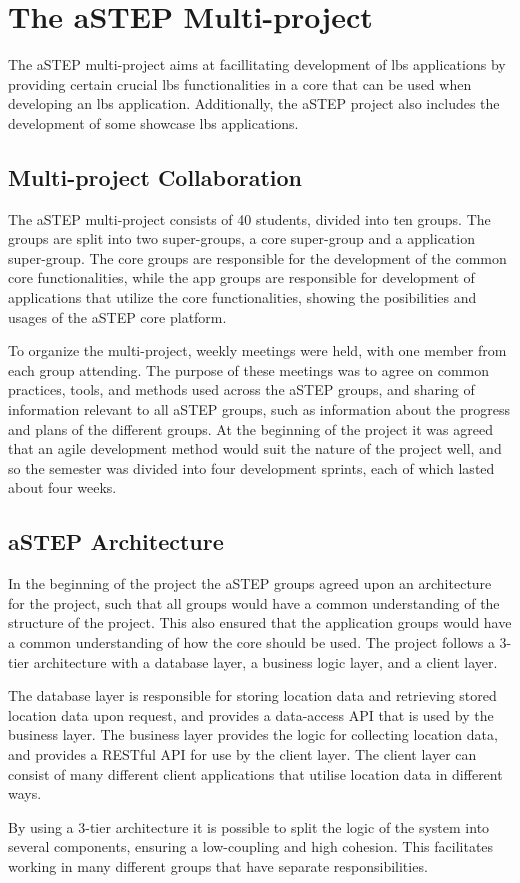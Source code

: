 \section{The aSTEP Multi-project} \label{sec:astep}
The aSTEP multi-project aims at facillitating development of \gls{lbs} applications by providing certain crucial \gls{lbs} functionalities in a core that can be used when developing an \gls{lbs} application. Additionally, the aSTEP project also includes the development of some showcase \gls{lbs} applications.

\subsection{Multi-project Collaboration}
The aSTEP multi-project consists of 40 students, divided into ten groups. The groups are split into two super-groups, a core super-group and a application super-group. The core groups are responsible for the development of the common core functionalities, while the app groups are responsible for development of applications that utilize the core functionalities, showing the posibilities and usages of the aSTEP core platform. 

To organize the multi-project, weekly meetings were held, with one member from each group attending. The purpose of these meetings was to agree on common practices, tools, and methods used across the aSTEP groups, and sharing of information relevant to all aSTEP groups, such as information about the progress and plans of the different groups. At the beginning of the project it was agreed that an agile development method would suit the nature of the project well, and so the semester was divided into four development sprints, each of which lasted about four weeks.

\subsection{aSTEP Architecture}
In the beginning of the project the aSTEP groups agreed upon an architecture for the project, such that all groups would have a common understanding of the structure of the project. This also ensured that the application groups would have a common understanding of how the core should be used. The project follows a 3-tier architecture with a database layer, a business logic layer, and a client layer. 

The database layer is responsible for storing location data and retrieving stored location data upon request, and provides a data-access API that is used by the business layer. The business layer provides the logic for collecting location data, and provides a RESTful API for use by the client layer. The client layer can consist of many different client applications that utilise location data in different ways.

By using a 3-tier architecture it is possible to split the logic of the system into several components, ensuring a low-coupling and high cohesion. This facilitates working in many different groups that have separate responsibilities.